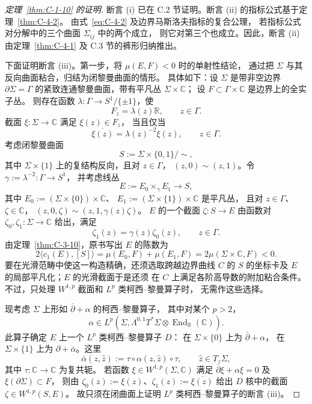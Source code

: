 \begin{proof}[定理~\ref{thm:C-1-10} 的证明]
断言 (i) 已在 C.2 节证明。断言 (ii) 的指标公式基于定理~\ref{thm:C-4-2}。
由式~\eqref{eq:C-4-2} 及边界马斯洛夫指标的复合公理，
若指标公式对分解中的三个曲面 $\Sigma_{ij}$ 中的两个成立，
则它对第三个也成立。因此，断言 (ii) 由定理~\ref{thm:C-4-1}
及 C.3 节的裤形归纳推出。

下面证明断言 (iii)。第一步，将 $\mu(E,F)<0$ 时的单射性结论，
通过把 $\Sigma$ 与其反向曲面粘合，归结为闭黎曼曲面的情形。
具体如下：设 $\Sigma$ 是带非空边界 $\partial\Sigma=\Gamma$
的紧致连通黎曼曲面，带有平凡丛 $\Sigma\times\mathbb C$；
设 $F\subset\Gamma\times\mathbb C$ 是边界上的全实子丛。
则存在函数 $\lambda:\Gamma\to S^1/\{\pm1\}$，使
\[
  F_z=\lambda(z)\mathbb R,\qquad z\in\Gamma.
\]
截面 $\xi:\Sigma\to\mathbb C$ 满足 $\xi(z)\in F_z$，
当且仅当
\[
  \overline{\xi(z)}=\lambda(z)^{-2}\xi(z),\qquad z\in\Gamma.
\]
考虑闭黎曼曲面
\[
  S:=\Sigma\times\{0,1\}/\sim,
\]
其中 $\Sigma\times\{1\}$ 上的复结构反向，且对 $z\in\Gamma$，
$(z,0)\sim(z,1)$。令 $\gamma:=\lambda^{-2}:\Gamma\to S^1$，
并考虑线丛
\[
  E:=E_0\times_\gamma E_1\longrightarrow S,
\]
其中 $E_0:=(\Sigma\times\{0\})\times\mathbb C$、
$E_1:=(\Sigma\times\{1\})\times\mathbb C$ 是平凡丛，
且对 $z\in\Gamma$、$\zeta\in\mathbb C$，
$(z,0,\zeta)\sim(z,1,\gamma(z)\zeta)$。
$E$ 的一个截面 $\zeta:S\to E$ 由函数对
$\zeta_0,\zeta_1:\Sigma\to\mathbb C$ 给出，满足
\[
  \zeta_1(z)=\gamma(z)\zeta_0(z),\qquad z\in\Gamma.
\]
由定理~\ref{thm:C-3-10}，原书写出 $E$ 的陈数为
\[
  2\langle c_1(E),[S]\rangle
   =\mu(E_0,F)+\mu(E_1,F)
   =2\mu(\Sigma\times\mathbb C,F)<0.
\]
要在光滑范畴中使这一构造精确，还须选取跨越边界曲线 $C$
的 $S$ 的坐标卡及 $E$ 的局部平凡化；$E$ 的光滑截面于是还须
在 $C$ 上满足各阶高导数的附加粘合条件。
不过，只处理 $W^{1,p}$ 截面和 $L^p$ 类柯西--黎曼算子时，
无需作这些选择。

现考虑 $\Sigma$ 上形如 $\bar\partial+\alpha$ 的柯西--黎曼算子，
其中对某个 $p>2$，
\[
  \alpha\in L^p(\Sigma,\Lambda^{0,1}T^*\Sigma
    \otimes\operatorname{End}_{\mathbb R}(\mathbb C)).
\]
此算子确定 $E$ 上一个 $L^p$ 类柯西--黎曼算子 $D$：
在 $\Sigma\times\{0\}$ 上为 $\bar\partial+\alpha$，
在 $\Sigma\times\{1\}$ 上为 $\partial+\bar\alpha$。这里
\[
  \bar\alpha(z,\widehat z):=
    \tau\circ\alpha(z,\widehat z)\circ\tau,
  \qquad \widehat z\in T_z\Sigma,
\]
其中 $\tau:\mathbb C\to\mathbb C$ 为复共轭。
若函数 $\xi\in W^{1,p}(\Sigma,\mathbb C)$ 满足
$\bar\partial\xi+\alpha\xi=0$ 及 $\xi(\partial\Sigma)\subset F$，
则由 $\zeta_0(z):=\xi(z)$、$\zeta_1(z):=\overline{\xi(z)}$
给出 $D$ 核中的截面 $\zeta\in W^{1,p}(S,E)$。
故只须在闭曲面上证明 $L^p$ 类柯西--黎曼算子的断言 (iii)。


\end{proof}
